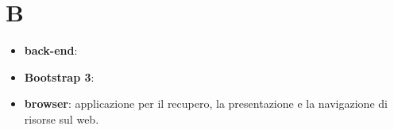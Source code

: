\section{B}
\begin{itemize} 
	\item \textbf{back-end}:
	\item \textbf{Bootstrap 3}:
	\item \textbf{browser}: applicazione per il recupero, la presentazione e la navigazione di risorse sul web.
\end{itemize}